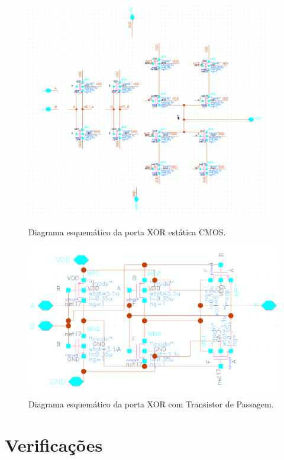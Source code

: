 \documentclass[a4paper,10pt] {article}
\begin{document}
\begin{figure}[h]
  \begin{minipage} [b] {0.48 \linewidth}
	\centering
	\includegraphics[scale=0.2]{xorStaticCMOSSchematic.png}
	\caption{Diagrama esquemático da porta XOR estática CMOS.}
	\label{fig:xorStaticSchematic}
  \end{minipage}
  \begin{minipage} [b] {0.48 \linewidth}
	\centering
	\includegraphics[scale=0.2]{xorTransGateSchematic.png}
	\caption{Diagrama esquemático da porta XOR com Transistor de Passagem.}
	\label{fig:xorTransSchematic}
  \end{minipage}
\end{figure}

\section{Verificações}
\label{sec:veri}
\end{document}
